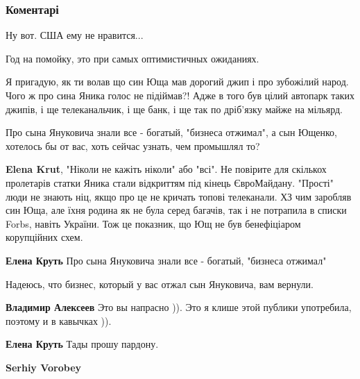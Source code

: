  
 
 
 
 
\subsubsection{Коментарі}
\label{sec:20_05_2018.fb.lesev_igor.1.pomojka_god_ukraina.cmt}

\begin{itemize} %
Ну вот. США ему не нравится...

Год на помойку, это при самых оптимистичных ожиданиях.

Я пригадую, як ти волав що син Юща мав дорогий джип і про зубожілий народ.
Чого ж про сина Яника голос не підіймав?! Адже в того був цілий автопарк таких джипів, і ще телеканальчик, і ще банк, і ще так по дріб'язку майже на мільярд.

\begin{itemize} %
Про сына Януковича знали все - богатый, "бизнеса отжимал", а сын Ющенко, хотелось бы от вас, хоть сейчас узнать, чем промышлял то?

\textbf{Elena Krut}, "Ніколи не кажіть ніколи" або "всі".
Не повірите для скількох пролетарів статки Яника стали відкриттям під кінець
ЄвроМайдану. "Прості" люди не знають ніц, якщо про це не кричать топові
телеканали.  ХЗ чим заробляв син Юща, але їхня родина як не була серед багачів,
так і не потрапила в списки Forbs, навіть України. Тож це показник, що Ющ не
був бенефіціаром корупційних схем.

\textbf{Елена Круть}
Про сына Януковича знали все - богатый, "бизнеса отжимал"

Надеюсь, что бизнес, который у вас отжал сын Януковича, вам вернули.

\textbf{Владимир Алексеев}
Это вы напрасно )). Это я клише этой публики употребила, поэтому и в кавычках )).

\textbf{Елена Круть} Тады прошу пардону.

\textbf{Serhiy Vorobey} 


\end{itemize}
\end{itemize}
